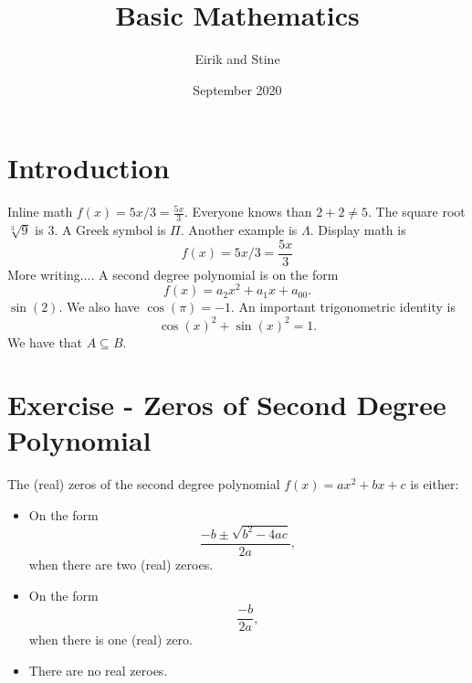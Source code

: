 \documentclass{article}
\title{Basic Mathematics}
\author{Eirik and Stine }
\date{September 2020}
\begin{document}
\maketitle

\section{Introduction}

Inline math $f(x) = 5x / 3 = \frac{5x}{3}$. Everyone knows than $2 + 2 \neq 5$. The square root $\sqrt[3]{9}$ is $3$. A Greek symbol is $\Pi$. Another example is $\Lambda$. Display math is 
\[f(x) = 5x / 3 = \frac{5x}{3}\] 
More writing.... A second degree polynomial is on the form 
\[f(x) = a_{2} x^{2} + a_{1}x + a_{00}.\]
$\sin(2)$. We also have $\cos(\pi) = -1$. An important trigonometric identity is 
\[\cos(x)^{2} + \sin(x)^{2} = 1.\]
We have that $A \subseteq B$.

\section{Exercise - Zeros of Second Degree Polynomial}

The (real) zeros of the second degree polynomial $f(x) = ax^2 + bx + c$ is either:
\begin{itemize}
    \item On the form 
    \[\frac{-b \pm \sqrt{b^{2} - 4ac}}{2a},\]
        when there are two (real) zeroes.
    \item On the form 
        \[\frac{-b}{2a},\]
        when there is one (real) zero.
    \item There are no real zeroes.
\end{itemize}
\end{document}
